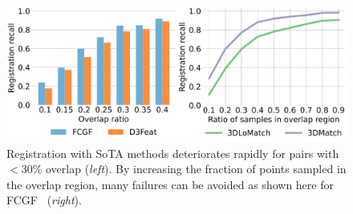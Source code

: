 \begin{figure}[t]
    \centering

    \includegraphics[width=0.8\columnwidth]{figures/images/motivation.jpg}
    \caption{Registration with SoTA methods deteriorates rapidly for pairs with $<$30\% overlap (\textit{left}). By increasing the fraction of points sampled in the overlap region, many failures can be avoided as shown here for FCGF~\cite{Choy2019FCGF} (\textit{right}).} 
    \label{fig:motivation}
    
\end{figure}